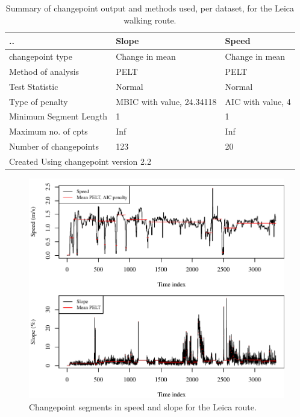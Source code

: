 \begin{table}[h]
\centering
\caption{Summary of changepoint output and methods used, per dataset, for the Leica walking route.}
\label{leicaCP}
\begin{tabular}{|p{175.3pt}|p{100.3pt}|p{100.3pt}|}
\hline
.. & Slope & Speed \\
\hline 
changepoint type 	& Change in mean 	& Change in mean 	\\
Method of analysis	& PELT 				& PELT 				\\
Test Statistic 		& Normal 			& Normal 			\\
Type of penalty		& MBIC with value, 24.34118 & AIC with value, 4 \\
Minimum Segment Length	& 1 			& 1 				 \\
Maximum no. of cpts 	& Inf 			& Inf 			 \\
Number of changepoints 	& 123			& 20				 \\
\hline
\multicolumn{3}{|l|}{Created Using changepoint version 2.2 } \\
\hline
\end{tabular}
\end{table}

\begin{figure}[H]
\includegraphics[width=\textwidth]{img/R_comparisonMethodsLeica.pdf}
\centering
\caption{Changepoint segments in speed and slope for the Leica route.\label{routeLeica}}
\end{figure} 



